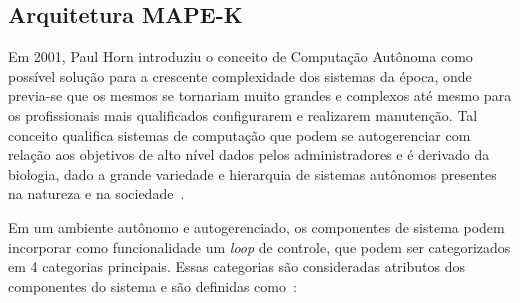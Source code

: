 \documentclass[Portugues,Final]{ic-tese-v3}
\begin{document}
\subsection{Arquitetura MAPE-K}

Em 2001, Paul Horn introduziu o conceito de Computação Autônoma como possível solução para a crescente complexidade dos sistemas da época, onde previa-se que os mesmos se tornariam muito grandes e complexos até mesmo para os profissionais mais qualificados configurarem e realizarem manutenção. Tal conceito qualifica sistemas de computação que podem se autogerenciar com relação aos objetivos de alto nível dados pelos administradores e é derivado da biologia, dado a grande variedade e hierarquia de sistemas autônomos presentes na natureza e na sociedade~\cite{Kephart_2003}. 

Em um ambiente autônomo e autogerenciado, os componentes de sistema podem incorporar como funcionalidade um \textit{loop} de controle, que podem ser categorizados em 4 categorias principais. Essas categorias são consideradas atributos dos componentes do sistema e são definidas como~\cite{IBM_2005}:
\end{document}
